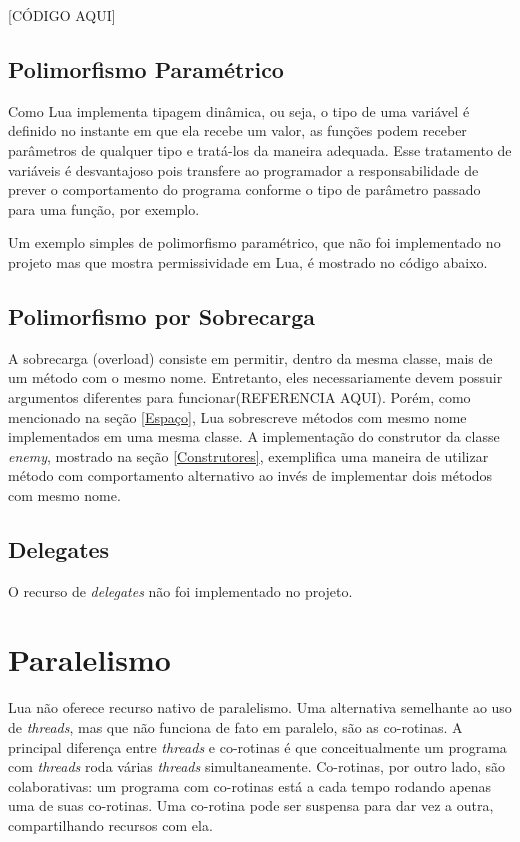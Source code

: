 \documentclass[rel_mlp]{iiufrgs}
\begin{document}
[CÓDIGO AQUI]


\section{Polimorfismo Paramétrico}

Como Lua implementa tipagem dinâmica, ou seja, o tipo de uma variável é definido no instante em que ela recebe um valor, as funções podem receber parâmetros de qualquer tipo e tratá-los da maneira adequada. Esse tratamento de variáveis é desvantajoso pois transfere ao programador a responsabilidade de prever o comportamento do programa conforme o tipo de parâmetro passado para uma função, por exemplo. 

Um exemplo simples de polimorfismo paramétrico, que não foi implementado no projeto mas que mostra permissividade em Lua, é mostrado no código abaixo.



\section{Polimorfismo por Sobrecarga}

A sobrecarga (overload) consiste em permitir, dentro da mesma classe, mais de um método com o mesmo nome. Entretanto, eles necessariamente devem possuir argumentos diferentes para funcionar(REFERENCIA AQUI). Porém, como mencionado na seção \ref{Espaço}, Lua sobrescreve métodos com mesmo nome implementados em uma mesma classe. A implementação do construtor da classe \textit{enemy}, mostrado na seção \ref{Construtores}, exemplifica uma maneira de utilizar método com comportamento alternativo ao invés de implementar dois métodos com mesmo nome.

\section{Delegates}

O recurso de \textit{delegates} não foi implementado no projeto. 

\chapter{Paralelismo}

Lua não oferece recurso nativo de paralelismo. Uma alternativa semelhante ao uso de \textit{threads}, mas que não funciona de fato em paralelo, são as co-rotinas. A principal diferença entre \textit{threads} e co-rotinas é que conceitualmente um programa com \textit{threads} roda várias \textit{threads} simultaneamente. Co-rotinas, por outro lado, são colaborativas: um programa com co-rotinas está a cada tempo rodando apenas uma de suas co-rotinas. Uma co-rotina pode ser suspensa para dar vez a outra, compartilhando recursos com ela.
\end{document}
